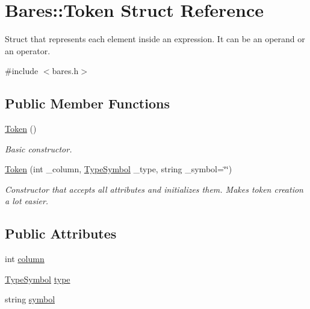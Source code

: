 \hypertarget{structBares_1_1Token}{}\section{Bares\+:\+:Token Struct Reference}
\label{structBares_1_1Token}


Struct that represents each element inside an expression. It can be an operand or an operator.  




{\ttfamily \#include $<$bares.\+h$>$}

\subsection*{Public Member Functions}
\begin{DoxyCompactItemize}
\item 
\hyperlink{structBares_1_1Token_afefce0c2a9140f499b2bc91a5b383d0c}{Token} ()\hypertarget{structBares_1_1Token_afefce0c2a9140f499b2bc91a5b383d0c}{}\label{structBares_1_1Token_afefce0c2a9140f499b2bc91a5b383d0c}

\begin{DoxyCompactList}\small\item\em Basic constructor. \end{DoxyCompactList}\item 
\hyperlink{structBares_1_1Token_ab70f4505f1bc9a1fae540b6198e28b23}{Token} (int \+\_\+column, \hyperlink{classBares_a656cd507b0ddaa049dc7e6548459b6d8}{Type\+Symbol} \+\_\+type, string \+\_\+symbol=\char`\"{}\char`\"{})\hypertarget{structBares_1_1Token_ab70f4505f1bc9a1fae540b6198e28b23}{}\label{structBares_1_1Token_ab70f4505f1bc9a1fae540b6198e28b23}

\begin{DoxyCompactList}\small\item\em Constructor that accepts all attributes and initializes them. Makes token creation a lot easier. \end{DoxyCompactList}\end{DoxyCompactItemize}
\subsection*{Public Attributes}
\begin{DoxyCompactItemize}
\item 
int \hyperlink{structBares_1_1Token_af3adba034744030cd8179d3627098b48}{column}
\item 
\hyperlink{classBares_a656cd507b0ddaa049dc7e6548459b6d8}{Type\+Symbol} \hyperlink{structBares_1_1Token_a64dd409f656e8345531df4025986be40}{type}
\item 
string \hyperlink{structBares_1_1Token_a84b0d3edd9f59ac058c494b007770578}{symbol}
\end{DoxyCompactItemize}


